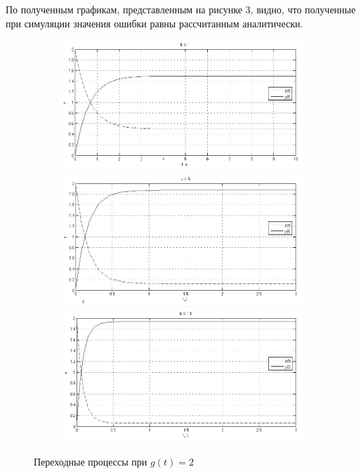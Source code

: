\documentclass[a4paper, 11pt, russian]{article}
\begin{document}
    По полученным графикам, представленным на рисунке 3, видно, что полученные при симуляции значения ошибки равны рассчитанным аналитически.\\
    \begin{figure}[h!]
        \centering
        \begin{subfigure}[h]{0.7\textwidth}
            \includegraphics[width = \textwidth]{constInput0ast1k.png}
            \\
            \includegraphics[width = \textwidth]{constInput0ast5k.png}
            \\
            \includegraphics[width = \textwidth]{constInput0ast10k.png}
        \end{subfigure}
        \caption{Переходные процессы при $g(t) = 2$}
    \end{figure}
    \vspace{1.5cm} %
\end{document}
